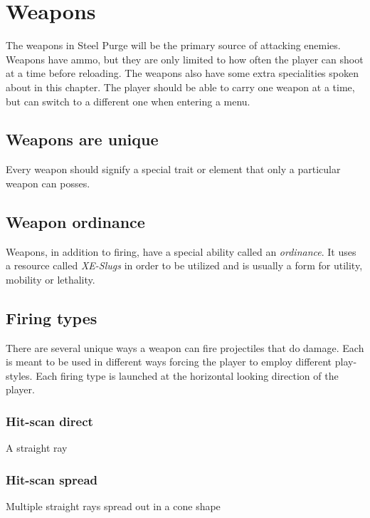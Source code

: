 \documentclass[../Main.tex]{subfiles}
\begin{document}
\section{Weapons}

The weapons in Steel Purge will be the primary source of attacking enemies. Weapons have ammo, but they are only limited to how often the player can shoot at a time before reloading. The weapons also have some extra specialities spoken about in this chapter. The player should be able to carry one weapon at a time, but can switch to a different one when entering a menu.

\subsection{Weapons are unique}

Every weapon should signify a special trait or element that only a particular weapon can posses.

\subsection{Weapon ordinance}

Weapons, in addition to firing, have a special ability called an \emph{ordinance}. It uses a resource called \emph{XE-Slugs} in order to be utilized and is usually a form for utility, mobility or lethality.

\subsection{Firing types}

There are several unique ways a weapon can fire projectiles that do damage. Each is meant to be used in different ways forcing the player to employ different play-styles. Each firing type is launched at the horizontal looking direction of the player. 

\subsubsection{Hit-scan direct}

A straight ray 

\subsubsection{Hit-scan spread}

Multiple straight rays spread out in a cone shape
\end{document}
